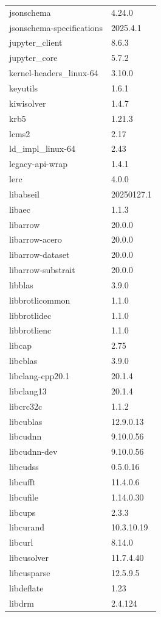 \begin{longtable}{ll}
    jsonschema&4.24.0 \\
    jsonschema-specifications&2025.4.1 \\
    jupyter\_client&8.6.3 \\
    jupyter\_core&5.7.2 \\
    kernel-headers\_linux-64&3.10.0 \\
    keyutils&1.6.1 \\
    kiwisolver&1.4.7 \\
    krb5&1.21.3 \\
    lcms2&2.17 \\
    ld\_impl\_linux-64&2.43 \\
    legacy-api-wrap&1.4.1 \\
    lerc&4.0.0 \\
    libabseil&20250127.1 \\
    libaec&1.1.3 \\
    libarrow&20.0.0 \\
    libarrow-acero&20.0.0 \\
    libarrow-dataset&20.0.0 \\
    libarrow-substrait&20.0.0 \\
    libblas&3.9.0 \\
    libbrotlicommon&1.1.0 \\
    libbrotlidec&1.1.0 \\
    libbrotlienc&1.1.0 \\
    libcap&2.75 \\
    libcblas&3.9.0 \\
    libclang-cpp20.1&20.1.4 \\
    libclang13&20.1.4 \\
    libcrc32c&1.1.2 \\
    libcublas&12.9.0.13 \\
    libcudnn&9.10.0.56 \\
    libcudnn-dev&9.10.0.56 \\
    libcudss&0.5.0.16 \\
    libcufft&11.4.0.6 \\
    libcufile&1.14.0.30 \\
    libcups&2.3.3 \\
    libcurand&10.3.10.19 \\
    libcurl&8.14.0 \\
    libcusolver&11.7.4.40 \\
    libcusparse&12.5.9.5 \\
    libdeflate&1.23 \\
    libdrm&2.4.124 \\

\end{longtable}
